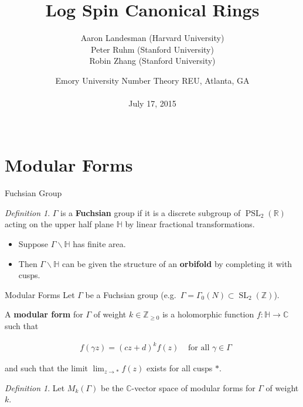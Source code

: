 \documentclass{beamer}
\title{Log Spin Canonical Rings}
\author[A. Landesman, P. Ruhm, and R. Zhang]{
Aaron Landesman (Harvard University) \\
Peter Ruhm (Stanford University) \\
Robin Zhang (Stanford University)
}
\date[July 17, 2015]{
Emory University Number Theory REU, Atlanta, GA\\
\mbox{}\\
July 17, 2015\\
\mbox{}\\
}
\theoremstyle{remark}
\newtheorem{defn}[thm]{Definition}
\newcommand\BH{{\mathbb H}}
\newcommand\BC{{\mathbb C}}
\newcommand\BR{{\mathbb R}}
\newcommand\BZ{{\mathbb Z}}
\newcommand{\SL}{\operatorname{SL}}
\newcommand{\PSL}{\operatorname{PSL}}
\begin{document}
\begin{frame}
	\titlepage
\end{frame}

\section{Modular Forms} 

\begin{frame}{Fuchsian Group}

\begin{defn}
$\Gamma$ is a {\bf Fuchsian} group if it is a discrete subgroup of
$\PSL_2(\BR)$ acting on the upper half plane $\BH$ by linear fractional transformations.
\end{defn}


\begin{itemize}
\item Suppose $\Gamma \backslash \BH$ has finite area. \\

\item Then $\Gamma \backslash \BH$ can be given the structure of an {\bf{orbifold}} by completing it with cusps.  
\end{itemize}

\end{frame}


\begin{frame}{Modular Forms}
Let $\Gamma$  be a Fuchsian group (e.g.~$\Gamma = \Gamma_0(N) \subset \SL_2(\BZ)$).

\begin{definition}
A \textbf{modular form} for $\Gamma$ of weight $k \in \BZ_{\geq 0}$ is a holomorphic function $f \colon \BH \to \BC$ such that

\begin{align*}
	&f(\gamma z) = (cz+d)^k f(z) &\text{ for all } \gamma \in \Gamma 
\end{align*}

\noindent
and such that the limit $\lim_{z \to *} f(z)$ exists for all cusps $*$.
\end{definition}


\begin{defn}
  Let $M_k(\Gamma)$ be the $\BC$-vector space of modular forms for $\Gamma$ of weight $k$.    
\end{defn}

\end{frame}
\end{document}
